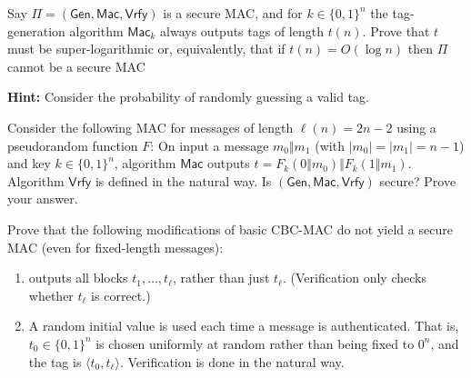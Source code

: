 \documentclass[a4paper,10pt,landscape,twocolumn]{scrartcl}
\begin{document}
\problems


\begin{exercise}
Say $\Pi=(\mathsf{Gen},\mathsf{Mac},\mathsf{Vrfy})$ is a secure MAC, and for $k\in\{0,1\}^n$ the tag-generation algorithm $\mathsf{Mac}_k$ always outputs tags of length $t(n)$. Prove that $t$ must be super-logarithmic or, equivalently, that if $t(n)=O(\log n)$ then $\Pi$ cannot be a secure MAC

\textbf{Hint:} Consider the probability of randomly guessing a valid tag.
\end{exercise}

\begin{exercise}
Consider the following MAC for messages of length $\ell(n)=2n-2$ using a pseudorandom function $F$: On input a message $m_0\Vert m_1$ (with $|m_0|=|m_1|=n-1$) and key $k\in\{0,1\}^n$, algorithm $\mathsf{Mac}$ outputs $t=F_k(0\Vert m_0)\Vert F_k(1\Vert m_1)$. Algorithm $\mathsf{Vrfy}$ is defined in the natural way. Is $(\mathsf{Gen},\mathsf{Mac},\mathsf{Vrfy})$ secure? Prove your answer.
\end{exercise}

\begin{exercise}
  Prove that the following modifications of basic CBC-MAC do not yield a
secure MAC (even for fixed-length messages):
\begin{enumerate}
\item \mac outputs all blocks $t_1, \ldots , t_\ell$, rather than just $t_\ell$. (Verification only checks whether $t_\ell$ is correct.)
\item A random initial value is used each time a message is authenticated. That is, $t_0 \in \{0, 1\}^n$ is chosen uniformly at random rather than being fixed to $0^n$, and the tag is $\langle t_0, t_\ell \rangle$. Verification is done in the natural way.
\end{enumerate}
\end{exercise}
\end{document}
